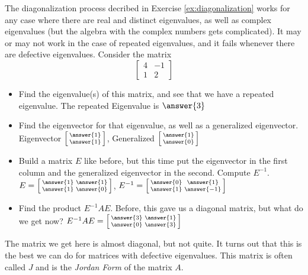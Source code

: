 \documentclass{ximera}
\begin{document}
\begin{exercise} \label{ex:jordanform}
    The diagonalization process decribed in Exercise \ref{ex:diagonalization} works for any case where there are real and distinct eigenvalues, as well as complex eigenvalues (but the algebra with the complex numbers gets complicated). It may or may not work in the case of repeated eigenvalues, and it fails whenever there are defective eigenvalues. Consider the matrix
    \[ 
    \begin{bmatrix} 
    4 & -1 \\ 
    1 & 2 
    \end{bmatrix} 
    \]
    \begin{itemize}
        \item Find the eigenvalue(s) of this matrix, and see that we have a repeated eigenvalue. The repeated Eigenvalue is $\answer{3}$
        \item Find the eigenvector for that eigenvalue, as well as a generalized eigenvector.\\
        Eigenvector $\left[\begin{smallmatrix}  \answer{1} \\ \answer{1} \end{smallmatrix}\right]$, Generalized $\left[\begin{smallmatrix} \answer{1} \\ \answer{0} \end{smallmatrix}\right]$
        \item Build a matrix $E$ like before, but this time put the eigenvector in the first column and the generalized eigenvector in the second. Compute $E^{-1}$. \\
        $E = \left[\begin{smallmatrix} \answer{1} & \answer{1} \\ \answer{1} & \answer{0} \end{smallmatrix}\right]$, $E^{-1} = \left[\begin{smallmatrix}  \answer{0} & \answer{1} \\ \answer{1} & \answer{-1} \end{smallmatrix}\right]$
        \item Find the product $E^{-1}AE$. Before, this gave us a diagonal matrix, but what do we get now? 
        $E^{-1}AE = \left[\begin{smallmatrix} \answer{3} & \answer{1} \\ \answer{0} & \answer{3} \end{smallmatrix}\right]$
    \end{itemize}
    \begin{feedback}[correct]
        The matrix we get here is almost diagonal, but not quite. It turns out that this is the best we can do for matrices with defective eigenvalues. This matrix is often called $J$ and is the \emph{Jordan Form} of the matrix $A$. 
    \end{feedback}
\end{exercise}
\end{document}
